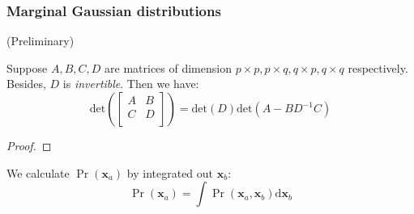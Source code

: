 \subsubsection{Marginal Gaussian distributions}
(Preliminary)
\begin{conclusion}
Suppose $A,B,C, D$ are matrices of dimension
$p\times{}p,p\times{}q,q\times{}p,q\times{}q$ respectively. Besides,
    $D$ is \emph{invertible}. Then we have:
\begin{equation}
\text{det}(\begin{bmatrix}A&B\\C&D\\\end{bmatrix})=\text{det}(D)\text{det}(A-BD^{-1}C)
\label{eqn:blockmatricesdet}
\end{equation}
\end{conclusion}
\begin{proof}
\end{proof}
We calculate $\Pr(\mathbf{x}_{a})$ by integrated out $\mathbf{x}_b$:
\begin{equation}
\Pr(\mathbf{x}_a)=\int{}\Pr(\mathbf{x}_{a},\mathbf{x}_{b})\text{d}\mathbf{x}_{b}
\end{equation}



